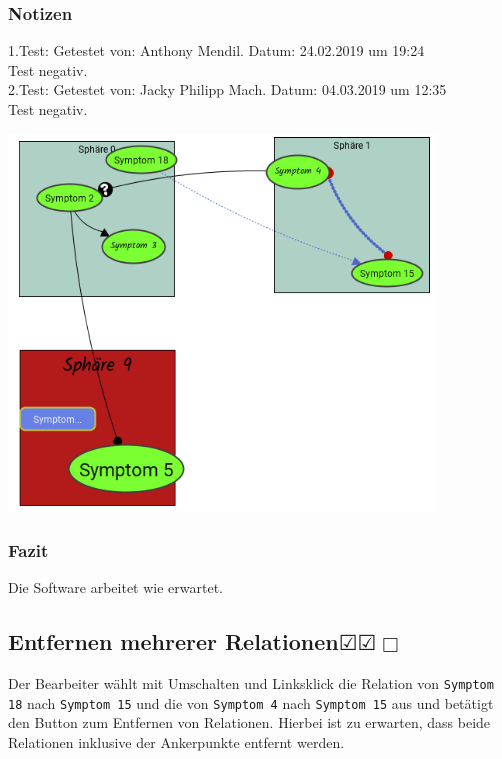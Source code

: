 \documentclass[enabledeprecatedfontcommands]{scrartcl}
\newcommand{\subsectiont}[2]{\subsection[#1]{#1{\normalsize\normalfont #2}}}
\newcommand{\leer}{$\Box$}
\newcommand{\ok}{$\CheckedBox$}
\begin{document}
\subsubsection{Notizen}
1.Test: Getestet von: Anthony Mendil. Datum: 24.02.2019 um 19:24 \\
Test negativ.\\
2.Test: Getestet von: Jacky Philipp Mach. Datum: 04.03.2019 um 12:35 \\
Test negativ.
\begin{center}
\includegraphics[height=10cm]{3_39.PNG}
\end{center}
\subsubsection{Fazit}
Die Software arbeitet wie erwartet.

\subsectiont{Entfernen mehrerer Relationen}{\dotfill\ok\ok\leer}
Der Bearbeiter wählt mit Umschalten und Linksklick die Relation von \texttt{Symptom 18} nach \texttt{Symptom 15} und die von \texttt{Symptom 4} nach \texttt{Symptom 15} aus und betätigt den Button zum Entfernen von Relationen. Hierbei ist zu erwarten, dass beide Relationen inklusive der Ankerpunkte entfernt werden. 
\end{document}
